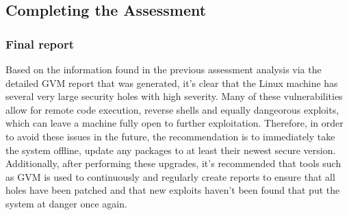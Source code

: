 \subsection{Completing the Assessment}
\subsubsection{Final report}
Based on the information found in the previous assessment analysis via the detailed GVM report that was generated, it's clear that the Linux machine has several very large security holes with high severity. Many of these vulnerabilities allow for remote code execution, reverse shells and equally dangeorous exploits, which can leave a machine fully open to further exploitation. Therefore, in order to avoid these issues in the future, the recommendation is to immediately take the system offline, update any packages to at least their newest secure version. Additionally, after performing these upgrades, it's recommended that tools such as GVM is used to continuously and regularly create reports to ensure that all holes have been patched and that new exploits haven't been found that put the system at danger once again.